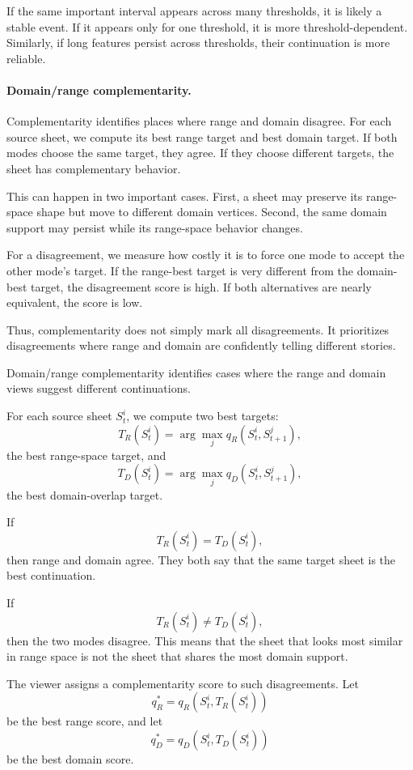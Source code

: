   If the same important interval appears across many thresholds, it is likely a stable event. If it appears only for one
  threshold, it is more threshold-dependent. Similarly, if long features persist across thresholds, their continuation is
  more reliable.

  \paragraph{Domain/range complementarity.}
  Complementarity identifies places where range and domain disagree. For each source sheet, we compute its best range
  target and best domain target. If both modes choose the same target, they agree. If they choose different targets, the
  sheet has complementary behavior.

  This can happen in two important cases. First, a sheet may preserve its range-space shape but move to different domain
  vertices. Second, the same domain support may persist while its range-space behavior changes.

  For a disagreement, we measure how costly it is to force one mode to accept the other mode's target. If the range-best
  target is very different from the domain-best target, the disagreement score is high. If both alternatives are nearly
  equivalent, the score is low.

  Thus, complementarity does not simply mark all disagreements. It prioritizes disagreements where range and domain are
  confidently telling different stories.

  Domain/range complementarity identifies cases where the range and domain views suggest different continuations.

  For each source sheet $S_t^i$, we compute two best targets:
  \[
  T_R(S_t^i)
  =
  \arg\max_j q_R(S_t^i,S_{t+1}^j),
  \]
  the best range-space target, and
  \[
  T_D(S_t^i)
  =
  \arg\max_j q_D(S_t^i,S_{t+1}^j),
  \]
  the best domain-overlap target.

  If
  \[
  T_R(S_t^i)=T_D(S_t^i),
  \]
  then range and domain agree. They both say that the same target sheet is the best continuation.

  If
  \[
  T_R(S_t^i)\neq T_D(S_t^i),
  \]
  then the two modes disagree. This means that the sheet that looks most similar in range space is not the sheet that
  shares the most domain support.

  The viewer assigns a complementarity score to such disagreements. Let
  \[
  q_R^*
  =
  q_R(S_t^i,T_R(S_t^i))
  \]
  be the best range score, and let
  \[
  q_D^*
  =
  q_D(S_t^i,T_D(S_t^i))
  \]
  be the best domain score.


